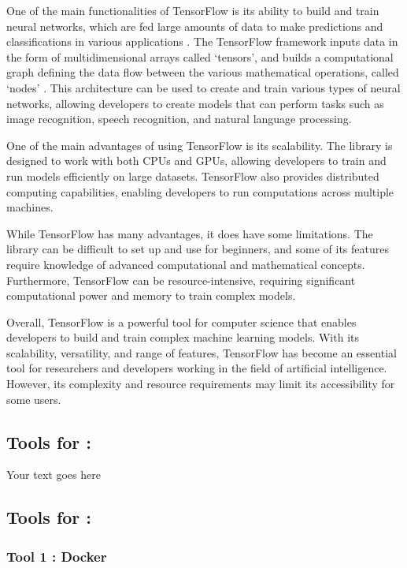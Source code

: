 \documentclass[a4paper, 11pt]{report}
\begin{document}
One of the main functionalities of TensorFlow is its ability to build and train neural networks, which are fed large amounts of data to make predictions and classifications in various applications \cite{ibm}. The TensorFlow framework inputs data in the form of multidimensional arrays called ‘tensors’, and builds a computational graph defining the data flow between the various mathematical operations, called ‘nodes’ \cite{simplilearn}. This architecture can be used to create and train various types of neural networks, allowing developers to create models that can perform tasks such as image recognition, speech recognition, and natural language processing.

One of the main advantages of using TensorFlow is its scalability. The library is designed to work with both CPUs and GPUs, allowing developers to train and run models efficiently on large datasets. TensorFlow also provides distributed computing capabilities, enabling developers to run computations across multiple machines.

While TensorFlow has many advantages, it does have some limitations. The library can be difficult to set up and use for beginners, and some of its features require knowledge of advanced computational and mathematical concepts. Furthermore, TensorFlow can be resource-intensive, requiring significant computational power and memory to train complex models.

Overall, TensorFlow is a powerful tool for computer science that enables developers to build and train complex machine learning models. With its scalability, versatility, and range of features, TensorFlow has become an essential tool for researchers and developers working in the field of artificial intelligence. However, its complexity and resource requirements may limit its accessibility for some users.

\subsection{Tools for \majB: \studB}

Your text goes here

\subsection{Tools for \majC: \studC}

\subsubsection{Tool 1 : Docker}
\end{document}

